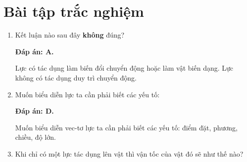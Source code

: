 \let\lesson\undefined
\newcommand{\lesson}{\phantomlesson{Bài 12.}}
\setcounter{section}{2}
\section{Bài tập trắc nghiệm}
\begin{enumerate}[label=\bfseries Câu \arabic*:]
	\item {}
	
	
	{Kết luận nào sau đây \textbf{không} đúng?
	}
	
	\hideall
	{		\textbf{Đáp án: A.}
		
		Lực có tác dụng làm biến đổi chuyển động hoặc làm vật biến dạng. Lực không có tác dụng duy trì chuyển động.
		
	}
	\item {}
	
	
	{Muốn biểu diễn lực ta cần phải biết các yếu tố:
	}
	
	\hideall
	{		\textbf{Đáp án: D.}
		
		Muốn biểu diễn vec-tơ lực ta cần phải biết các yếu tố: điểm đặt, phương, chiều, độ lớn.
		
	}
	\item {}
	
	
	{Khi chỉ có một lực tác dụng lên vật thì vận tốc của vật đó sẽ như thế nào?
	}
	

\end{enumerate}
